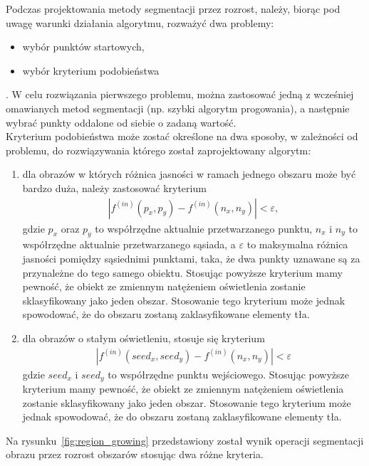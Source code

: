 Podczas projektowania metody segmentacji przez rozrost, należy, biorąc pod uwagę warunki działania algorytmu, rozważyć dwa problemy:
\begin{itemize}
  \item wybór punktów startowych,
  \item wybór kryterium podobieństwa
\end{itemize}.
W celu rozwiązania pierwszego problemu, można zastosować jedną z wcześniej omawianych metod segmentacji (np. szybki algorytm progowania), a następnie wybrać punkty oddalone od siebie o zadaną wartość. \\
Kryterium podobieństwa może zostać określone na dwa sposoby, w zależności od problemu, do rozwiązywania którego został zaprojektowany algorytm:
\begin{enumerate}
  \item dla obrazów w których różnica jasności w ramach jednego obszaru może być bardzo duża, należy zastosować kryterium 
    \begin{gather*}
      |f^{(in)}(p_x, p_y) - f^{(in)}(n_x, n_y)| < \varepsilon,
    \end{gather*}
    gdzie $p_x$ oraz $p_y$ to współrzędne aktualnie przetwarzanego punktu, $n_x$ i $n_y$ to współrzędne aktualnie przetwarzanego sąsiada, a $\varepsilon$ to maksymalna różnica jasności pomiędzy sąsiednimi punktami, taka, że dwa punkty uznawane są za przynależne do tego samego obiektu. Stosując powyższe kryterium mamy pewność, że obiekt ze zmiennym natężeniem oświetlenia zostanie sklasyfikowany jako jeden obszar. Stosowanie tego kryterium może jednak spowodować, że do obszaru zostaną zaklasyfikowane elementy tła.
    \item dla obrazów o stałym oświetleniu, stosuje się kryterium
      \begin{gather*}
        |f^{(in)}(seed_x, seed_y) - f^{(in)}(n_x, n_y)| < \varepsilon
      \end{gather*}
      gdzie $seed_x$ i $seed_y$ to współrzędne punktu wejściowego. Stosując powyższe kryterium mamy pewność, że obiekt ze zmiennym natężeniem oświetlenia zostanie sklasyfikowany jako jeden obszar. Stosowanie tego kryterium może jednak spowodować, że do obszaru zostaną zaklasyfikowane elementy tła.
\end{enumerate}
Na rysunku~\ref{fig:region_growing} przedstawiony został wynik operacji segmentacji obrazu przez rozrost obszarów stosując dwa różne kryteria.
